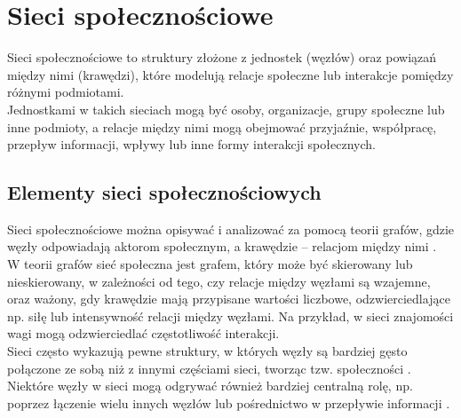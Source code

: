 \section{Sieci społecznościowe}
Sieci społecznościowe to struktury złożone z jednostek (węzłów) oraz powiązań między nimi (krawędzi), które modelują relacje społeczne lub interakcje pomiędzy różnymi podmiotami.
\\ Jednostkami w takich sieciach mogą być osoby, organizacje, grupy społeczne lub inne podmioty,
a relacje między nimi mogą obejmować przyjaźnie, współpracę, przepływ informacji, wpływy lub inne formy interakcji społecznych.

\subsection{Elementy sieci społecznościowych}
Sieci społecznościowe można opisywać i analizować za pomocą teorii grafów, gdzie węzły odpowiadają aktorom społecznym, a krawędzie – relacjom między nimi \cite{Wasserman1994}.
\\ W teorii grafów sieć społeczna jest grafem, który może być skierowany lub nieskierowany, w zależności od tego, czy relacje między węzłami są wzajemne, oraz ważony, gdy krawędzie mają przypisane wartości liczbowe,
odzwierciedlające np. siłę lub intensywność relacji między węzłami. Na przykład, w sieci znajomości wagi mogą odzwierciedlać częstotliwość interakcji.
\\ Sieci często wykazują pewne struktury, w których węzły są bardziej gęsto połączone ze sobą niż z innymi częściami sieci, tworząc tzw. społeczności \cite{Girvan2002}.
\\ Niektóre węzły w sieci mogą odgrywać również bardziej centralną rolę, np. poprzez łączenie wielu innych węzłów lub pośrednictwo w przepływie informacji \cite{Freeman1979}.


